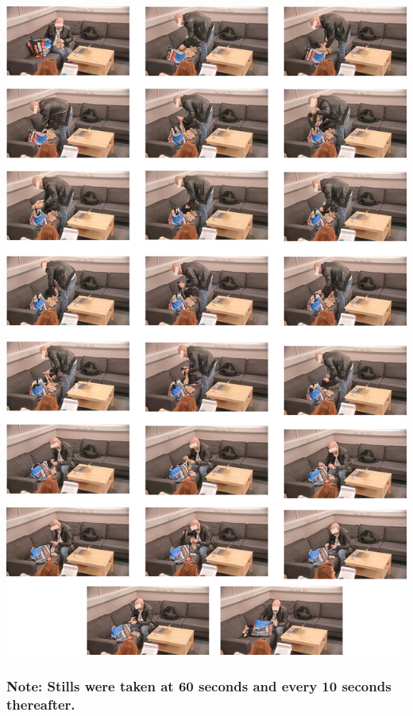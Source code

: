 \documentclass[twocolumn, serif, empirical, authordate]{jote-article}
\begin{document}
{{\includegraphics[width=5.25905in,height=8.51806in]{media/media/image4.png} 

\subsubsection{Note: Stills were taken at 60 seconds and every 10 seconds thereafter.}


\subsubsection{}


}}
\end{document}
